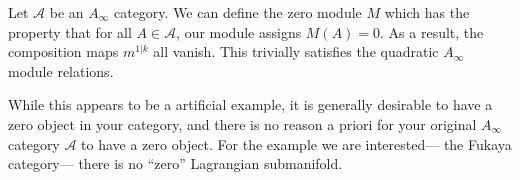 
Let $\mathcal A$ be an $A_\infty$ category. We can define the zero module $M$ which has the property that for all $A\in \mathcal A$, our module assigns $M(A)=0$. As a result, the composition maps $m^{1|k}$ all vanish. This trivially satisfies the quadratic $A_\infty$ module relations.

While this appears to be a artificial example, it is generally desirable to have a zero object in your category, and there is no reason a priori for your original $A_\infty$ category $\mathcal A$ to have a zero object. For the example we are interested--- the Fukaya category--- there is no ``zero'' Lagrangian submanifold.